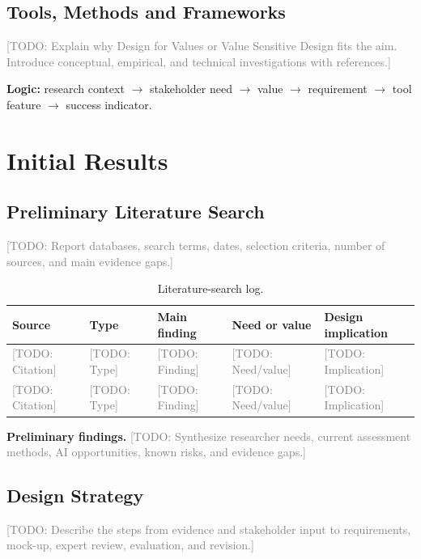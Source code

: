 \documentclass[11pt,a4paper]{article}
\newcommand{\placeholder}[1]{\textcolor{gray}{[TODO: #1]}}
\begin{document}
\subsection{Tools, Methods and Frameworks}
\placeholder{Explain why Design for Values or Value Sensitive Design fits the aim. Introduce conceptual, empirical, and technical investigations with references.}

\textbf{Logic:} research context $\rightarrow$ stakeholder need $\rightarrow$ value $\rightarrow$ requirement $\rightarrow$ tool feature $\rightarrow$ success indicator.

\section{Initial Results}

\subsection{Preliminary Literature Search}
\placeholder{Report databases, search terms, dates, selection criteria, number of sources, and main evidence gaps.}

\begin{table}[htbp]
\centering
\caption{Literature-search log.}
\small
\begin{tabularx}{\textwidth}{@{}p{}p{}XXp{}@{}}
\toprule
Source & Type & Main finding & Need or value & Design implication \\
\midrule
\placeholder{Citation} & \placeholder{Type} & \placeholder{Finding} & \placeholder{Need/value} & \placeholder{Implication} \\
\placeholder{Citation} & \placeholder{Type} & \placeholder{Finding} & \placeholder{Need/value} & \placeholder{Implication} \\
\bottomrule
\end{tabularx}
\end{table}

\textbf{Preliminary findings.}
\placeholder{Synthesize researcher needs, current assessment methods, AI opportunities, known risks, and evidence gaps.}

\FloatBarrier
\subsection{Design Strategy}
\placeholder{Describe the steps from evidence and stakeholder input to requirements, mock-up, expert review, evaluation, and revision.}
\end{document}
